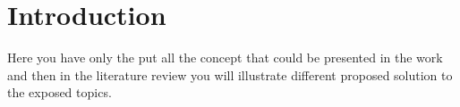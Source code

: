\chapter{Introduction} \label{chapter:introduction}

Here you have only the put all the concept that could be presented in the work and then in the literature review you will illustrate different proposed solution to the exposed topics.